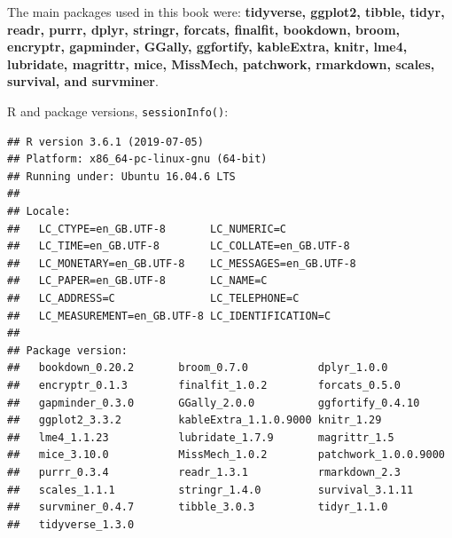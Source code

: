 \documentclass[
  12pt,
  krantz2]{krantz}
\begin{document}
The main packages used in this book were: \textbf{tidyverse, ggplot2, tibble, tidyr, readr, purrr, dplyr, stringr, forcats, finalfit, bookdown, broom, encryptr, gapminder, GGally, ggfortify, kableExtra, knitr, lme4, lubridate, magrittr, mice, MissMech, patchwork, rmarkdown, scales, survival, and survminer}.

R and package versions, \texttt{sessionInfo()}:

\begin{verbatim}
## R version 3.6.1 (2019-07-05)
## Platform: x86_64-pc-linux-gnu (64-bit)
## Running under: Ubuntu 16.04.6 LTS
## 
## Locale:
##   LC_CTYPE=en_GB.UTF-8       LC_NUMERIC=C              
##   LC_TIME=en_GB.UTF-8        LC_COLLATE=en_GB.UTF-8    
##   LC_MONETARY=en_GB.UTF-8    LC_MESSAGES=en_GB.UTF-8   
##   LC_PAPER=en_GB.UTF-8       LC_NAME=C                 
##   LC_ADDRESS=C               LC_TELEPHONE=C            
##   LC_MEASUREMENT=en_GB.UTF-8 LC_IDENTIFICATION=C       
## 
## Package version:
##   bookdown_0.20.2       broom_0.7.0           dplyr_1.0.0          
##   encryptr_0.1.3        finalfit_1.0.2        forcats_0.5.0        
##   gapminder_0.3.0       GGally_2.0.0          ggfortify_0.4.10     
##   ggplot2_3.3.2         kableExtra_1.1.0.9000 knitr_1.29           
##   lme4_1.1.23           lubridate_1.7.9       magrittr_1.5         
##   mice_3.10.0           MissMech_1.0.2        patchwork_1.0.0.9000 
##   purrr_0.3.4           readr_1.3.1           rmarkdown_2.3        
##   scales_1.1.1          stringr_1.4.0         survival_3.1.11      
##   survminer_0.4.7       tibble_3.0.3          tidyr_1.1.0          
##   tidyverse_1.3.0
\end{verbatim}

  

\backmatter
\printindex
\end{document}
